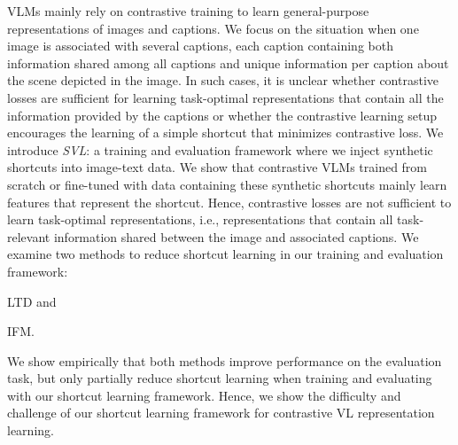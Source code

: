 
\Acfp{VLM} mainly rely on contrastive training to learn general-purpose representations of images and captions.
We focus on the situation when one image is associated with several captions, each caption containing both information shared among all captions and unique information per caption about the scene depicted in the image.
In such cases, it is unclear whether contrastive losses are sufficient for learning task-optimal representations that contain all the information provided by the captions or whether the contrastive learning setup encourages the learning of a simple shortcut that minimizes contrastive loss.
We introduce \textit{\acl{SVL}}: a training and evaluation framework where we inject synthetic shortcuts into image-text data.
We show that contrastive \ac{VLM}s trained from scratch or fine-tuned with data containing these synthetic shortcuts mainly learn features that represent the shortcut. 
Hence, contrastive losses are not sufficient to learn task-optimal representations, i.e., representations that contain all task-relevant information shared between the image and associated captions.
We examine two methods to reduce shortcut learning in our training and evaluation framework:
\begin{enumerate*}[label=(\roman*)]
\item \acl{LTD} and 
\item \acl{IFM}.
\end{enumerate*}
We show empirically that both methods improve performance on the evaluation task, but only partially reduce shortcut learning when training and evaluating with our shortcut learning framework.
Hence, we show the difficulty and challenge of our shortcut learning framework for contrastive \acl{VL} representation learning.
